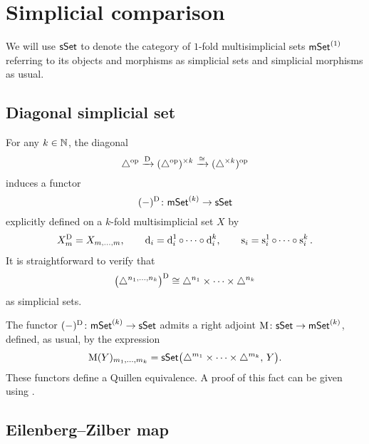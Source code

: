 
\section{Simplicial comparison} \label{s:comparison}

We will use $\mathsf{sSet}$ to denote the category of $1$-fold multisimplicial sets $\mathsf{mSet}^{(1)}$ referring to its objects and morphisms as simplicial sets and simplicial morphisms as usual.

\subsection{Diagonal simplicial set} \label{ss:diagonal}

For any $k \in \mathbb{N}$, the diagonal
\[
\triangle^{\mathrm{op}} \xrightarrow{\mathrm{D}}
(\triangle^{\mathrm{op}})^{\times k} \xrightarrow{\cong}
(\triangle^{\times k})^{\mathrm{op}}
\]
induces a functor
\[
(-)^{\mathrm{D}} \colon \mathsf{mSet}^{(k)} \to \mathsf{sSet}
\]
explicitly defined on a $k$-fold multisimplicial set $X$ by
\begin{gather*}
	X^{\mathrm{D}}_m = X_{m, \dots, m},
	\qquad
	\operatorname{d}_i = \operatorname{d}_i^1 \circ \dots \circ \operatorname{d}_i^k,
	\qquad
	\operatorname{s}_i = \operatorname{s}_i^1 \circ \dots \circ \operatorname{s}_i^k.
\end{gather*}
It is straightforward to verify that
\[
\big(\triangle^{n_1,\dots,n_k}\big)^{\mathrm{D}} \cong
\triangle^{n_1}\times\dots\times\triangle^{n_k}
\]
as simplicial sets.

The functor $(-)^{\mathrm{D}} \colon \mathsf{mSet}^{(k)} \to \mathsf{sSet}$ admits a right adjoint $\operatorname{M} \colon \mathsf{sSet} \to \mathsf{mSet}^{(k)}$, defined, as usual, by the expression
\[
\operatorname{M}(Y)_{m_1,\dots,m_k} =
\mathsf{sSet}\big( \triangle^{m_1} \times \dots \times \triangle^{m_k}, \, Y \big).
\]
These functors define a Quillen equivalence.
A proof of this fact can be given using \cite[Proposition~1.6.8]{maltsiniotis2005grothendieck}.

\subsection{Eilenberg--Zilber map} \label{ss:eilenber-zilber}

